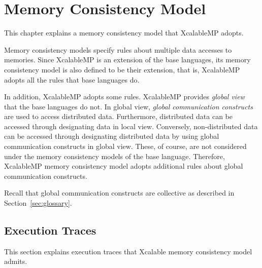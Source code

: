 

\chapter{Memory Consistency Model}



This chapter explains a memory consistency model that XcalableMP adopts.

Memory consistency models specify rules about multiple data accesses
to memories.  Since XcalableMP is an extension of the base languages,
its memory consistency model is also defined to be their extension,
that is, XcalableMP adopts all the rules that base languages do.

In addition, XcalableMP adopts some rules.  XcalableMP provides
\emph{global view} that the base languages do not.  In global view,
\emph{global communication constructs} are used to access distributed
data.  Furthermore, distributed data can be accessed through
designating data in local view.  Conversely, non-distributed data can
be accessed through designating distributed data by using global
communication constructs in global view.  These, of course, are not
considered under the memory consistency models of the base language.
Therefore, XcalableMP memory consistency model adopts additional rules
about global communication constructs.

Recall that global communication constructs are collective as
described in Section~\ref{sec:glossary}.

\section{Execution Traces}

\newcommand{\Coloneqq}{\mathrel{\colon\!=}}
\newcommand{\xsync}{\texttt{xmp\_syncro}}
\newcommand{\xasync}[1]{\texttt{xmp\_asyncro}(#1)}
\newcommand{\waitasync}[1]{\texttt{wait\_async}(#1)}
\newcommand{\fstmt}{\texttt{f\_stmt}}
\newcommand{\F}[2]{\texttt{Fetch}^{#1} \: {#2}}
\newcommand{\E}[2]{\texttt{Execute}^{#1} \: {#2}}
\newcommand{\R}[2]{\texttt{Reflect}^{#1} \: {#2}}

This section explains execution traces that Xcalable memory
consistency model admits.

